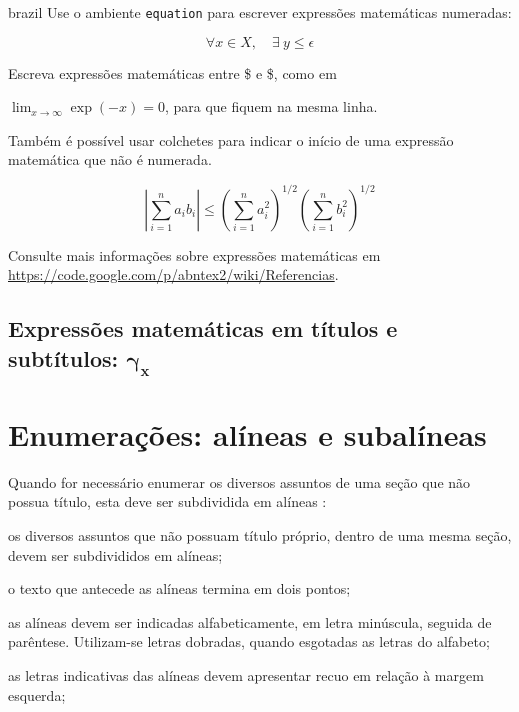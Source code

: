 \begin{otherlanguage*}{brazil}
 Use o ambiente \texttt{equation} para escrever
expressões matemáticas numeradas:

\begin{equation}
  \forall x \in X, \quad \exists \: y \leq \epsilon
\end{equation}

Escreva expressões matemáticas entre \$ e \$, como em

 $\lim_{x \to \infty}
\exp(-x) = 0 $, para que fiquem na mesma linha.

Também é possível usar colchetes para indicar o início de uma expressão
matemática que não é numerada.

\[
\left|\sum_{i=1}^n a_ib_i\right|
\le
\left(\sum_{i=1}^n a_i^2\right)^{1/2}
\left(\sum_{i=1}^n b_i^2\right)^{1/2}
\]

Consulte mais informações sobre expressões matemáticas em
\url{https://code.google.com/p/abntex2/wiki/Referencias}.


\subsection{Expressões matemáticas em títulos e subtítulos: \texorpdfstring{$\boldsymbol{\gamma_x}$}{Gammax}}






\section{Enumerações: alíneas e subalíneas}

Quando for necessário enumerar
os diversos assuntos de uma seção que não possua título, esta deve ser
subdividida em alíneas \cite[4.2]{NBR6024:2012}:

\begin{alineas}

  \item os diversos assuntos que não possuam título próprio, dentro de uma mesma
  seção, devem ser subdivididos em alíneas;

  \item o texto que antecede as alíneas termina em dois pontos;
  \item as alíneas devem ser indicadas alfabeticamente, em letra minúscula,
  seguida de parêntese. Utilizam-se letras dobradas, quando esgotadas as
  letras do alfabeto;

  \item as letras indicativas das alíneas devem apresentar recuo em relação à
  margem esquerda;


\end{alineas}
\end{otherlanguage*}
